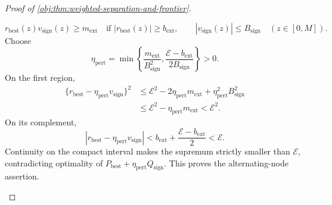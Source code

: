 \documentclass[11pt]{article}
\begin{document}
\begin{proof}[Proof of \cref{obj:thm:weighted-separation-and-frontier}]
\begin{enumerate}
\[
r_{\mathrm{best}}(z)v_{\mathrm{sign}}(z)\ge m_{\mathrm{ext}}
\quad\text{if }|r_{\mathrm{best}}(z)|\ge b_{\mathrm{ext}},
\qquad
|v_{\mathrm{sign}}(z)|\le B_{\mathrm{sign}}
\quad(z\in[0,M]).
\]
Choose
\[
\eta_{\mathrm{pert}}
=\min\left\{
\frac{m_{\mathrm{ext}}}{B_{\mathrm{sign}}^2},
\frac{\mathcal E-b_{\mathrm{ext}}}{2B_{\mathrm{sign}}}
\right\}>0.
\]
On the first region,
\[
\begin{aligned}
\{r_{\mathrm{best}}-\eta_{\mathrm{pert}}v_{\mathrm{sign}}\}^2
&\le
\mathcal E^2-2\eta_{\mathrm{pert}}m_{\mathrm{ext}}
+\eta_{\mathrm{pert}}^2B_{\mathrm{sign}}^2\\
&\le\mathcal E^2-\eta_{\mathrm{pert}}m_{\mathrm{ext}}
<\mathcal E^2.
\end{aligned}
\]
On its complement,
\[
|r_{\mathrm{best}}-\eta_{\mathrm{pert}}v_{\mathrm{sign}}|
<
b_{\mathrm{ext}}+\frac{\mathcal E-b_{\mathrm{ext}}}{2}
<\mathcal E.
\]
Continuity on the compact interval makes the supremum strictly smaller than \(\mathcal E\), contradicting optimality of
\(P_{\mathrm{best}}+\eta_{\mathrm{pert}}Q_{\mathrm{sign}}\). This proves the alternating-node assertion.


\end{enumerate}
\end{proof}
\end{document}

